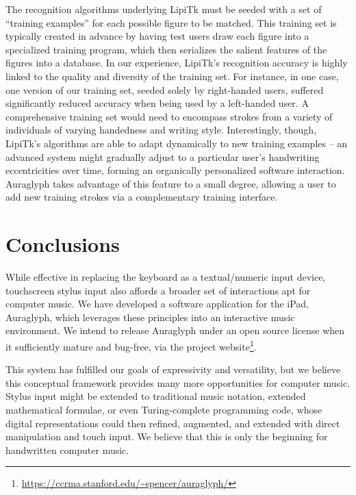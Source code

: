 \documentclass{nime-alternate}
\begin{document}
The recognition algorithms underlying LipiTk must be seeded with a set of ``training examples'' for each possible figure to be matched. 
This training set is typically created in advance by having test users draw each figure into a specialized training program, which then serializes the salient features of the figures into a database. 
In our experience, LipiTk's recognition accuracy is highly linked to the quality and diversity of the training set. 
For instance, in one case, one version of our training set, seeded solely by right-handed users, suffered significantly reduced accuracy when being used by a left-handed user. 
A comprehensive training set would need to encompass strokes from a variety of individuals of varying handedness and writing style. 
Interestingly, though, LipiTk's algorithms are able to adapt dynamically to new training examples -- an advanced system might gradually adjust to a particular user's handwriting eccentricities over time, forming an organically personalized software interaction. 
Auraglyph takes advantage of this feature to a small degree, allowing a user to add new training strokes via a complementary training interface. 

\section{Conclusions}
\label{sec:Conclusions}

While effective in replacing the keyboard as a textual/numeric input device, touchscreen stylus input also affords a broader set of interactions apt for computer music. 
We have developed a software application for the iPad, Auraglyph, which leverages these principles into an interactive music environment. 
We intend to release Auraglyph under an open source license when it sufficiently mature and bug-free, via the project website\footnote{\url{https://ccrma.stanford.edu/~spencer/auraglyph/}}.

This system has fulfilled our goals of expressivity and versatility, but we believe this conceptual framework provides many more opportunities for computer music. 
Stylus input might be extended to traditional music notation, extended mathematical formulae, or even Turing-complete programming code, whose digital representations could then refined, augmented, and extended with direct manipulation and touch input. 
We believe that this is only the beginning for handwritten computer music. 


%

%
%


\end{document}
